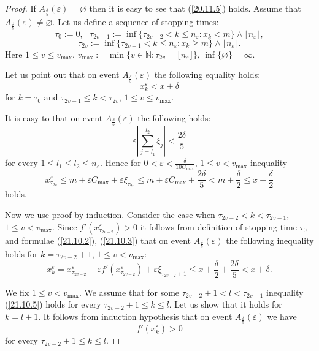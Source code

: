 \documentclass[10pt,a4paper]{amsart}
\newcommand{\beq}{\begin{equation}}
\newcommand{\eeq}{\end{equation}}
\begin{document}
\begin{proof}
If $A_{\frac{\delta}{5}}\left(\varepsilon\right)=\varnothing$ then it is easy to see that (\ref{20.11.5})
holds. Assume that $A_{\frac{\delta}{5}}\left(\varepsilon\right)\neq\varnothing$.
Let us define a sequence of stopping times:
$$
\tau_0:=0, \ \ \
\tau_{2v-1}:=\inf\{\tau_{2v-2}< k \leqslant n_\varepsilon:x_k<m\}\wedge \lfloor n_\varepsilon \rfloor,
$$
$$
\tau_{2v}:=\inf\{\tau_{2v-1}< k \leqslant n_\varepsilon:x_k\geqslant m\}\wedge \lfloor n_\varepsilon \rfloor.
$$
Here $1\leqslant v \leqslant v_{\max}$, $v_{\max}:=\min\{v\in \mathbb{N}:\tau_{2v}= \lfloor n_\varepsilon \rfloor\}$, $\inf\{\varnothing\}=\infty$.

Let us point out that on event $A_{\frac{\delta}{5}}\left(\varepsilon\right)$ the following equality holds:
\beq \label{21.10.1}
x_k^{\varepsilon}<x+\delta 
\eeq
for $k=\tau_0$ and $\tau_{2v-1}\leqslant k < \tau_{2v}$, $1\leqslant v \leqslant v_{\max}$.


It is easy to that on event $A_{\frac{\delta}{5}}\left(\varepsilon\right)$ the following holds:
\beq \label{21.10.2}
\varepsilon\left|\sum\limits_{j=l_1}^{l_2}\xi_j\right|<\frac{2\delta}{5}
\eeq
for every $1\leqslant l_1\leqslant l_2 \leqslant n_\varepsilon$. Hence for $0<\varepsilon<\frac{\delta}{10C_{\max}}$,
$1\leqslant v < v_{\max}$ inequality
\beq \label{21.10.3}
x_{\tau_{2v}}^{\varepsilon}\leqslant m+ \varepsilon C_{\max}+\varepsilon\xi_{\tau_{2v}}
\leqslant m+ \varepsilon C_{\max}+\frac{2\delta}{5}<m+\frac{\delta}{2}
\leqslant x+\frac{\delta}{2}
\eeq
holds.

Now we use proof by induction. Consider the case when
 $\tau_{2v-2}<k< \tau_{2v-1}$, $1\leqslant v < v_{\max}$. Since $f'(x_{\tau_{2v-2}}^{\varepsilon})>0$ it follows from definition of stopping time $\tau_0$
and formulae (\ref{21.10.2}), (\ref{21.10.3})  that on event $A_{\frac{\delta}{5}}\left(\varepsilon\right)$ the following inequality holds for $k=\tau_{2v-2}+1$, $1\leqslant v < v_{\max}$:
\beq \label{21.10.5}
x_k^{\varepsilon}=x_{\tau_{2v-2}}^{\varepsilon}-\varepsilon f'(x_{\tau_{2v-2}}^{\varepsilon})+\varepsilon\xi_{\tau_{2v-2}+1}
\leqslant x+\frac{\delta}{2}+\frac{2\delta}{5}<x+\delta.
\eeq

We fix $1\leqslant v < v_{\max}$.
We assume that for some $\tau_{2v-2}+1<l<\tau_{2v-1}$ inequality (\ref{21.10.5}) holds for every $\tau_{2v-2}+1\leqslant k\leqslant l$. Let us show that it holds for $k=l+1$. It follows from induction hypothesis that on event $A_{\frac{\delta}{5}}\left(\varepsilon\right)$ we have
\beq \label{21.10.7}
f'(x_k^{\varepsilon})>0
\eeq
for every $\tau_{2v-2}+1\leqslant k\leqslant l$.


\end{proof}
\end{document}
